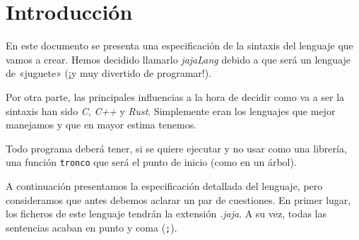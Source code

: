 \section{Introducción}
En este documento se presenta una especificación de la sintaxis del lenguaje que
vamos a crear. Hemos decidido llamarlo \textit{jajaLang} debido a que será un
lenguaje de «juguete» (¡y muy divertido de programar!).

Por otra parte, las principales influencias a la hora de decidir como va a ser
la sintaxis han sido \textit{C}, \textit{C++} y \textit{Rust}. Simplemente eran
los lenguajes que mejor manejamos y que en mayor estima tenemos.

Todo programa deberá tener, si se quiere ejecutar y no usar como una
librería, una función \lstinline{tronco} que será el punto de inicio (como en un
árbol).

A continuación presentamos la especificación detallada del lenguaje, pero
consideramos que antes debemos aclarar un par de cuestiones. En primer lugar,
los ficheros de este lenguaje tendrán la extensión \textit{.jaja}. A su vez,
todas las sentencias acaban en punto y coma (\lstinline{;}).

